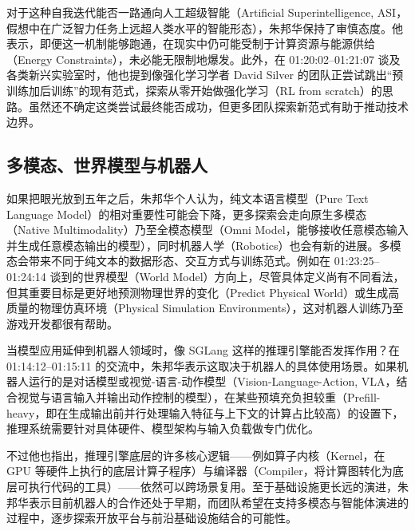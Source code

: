 \documentclass[UTF8,a4paper,11pt,fontset=fandol]{ctexart}
\begin{document}
对于这种自我迭代能否一路通向人工超级智能（Artificial Superintelligence, ASI，假想中在广泛智力任务上远超人类水平的智能形态），朱邦华保持了审慎态度。他表示，即便这一机制能够跑通，在现实中仍可能受制于计算资源与能源供给（Energy Constraints），未必能无限制地爆发。此外，在 01:20:02–01:21:07 谈及各类新兴实验室时，他也提到像强化学习学者 David Silver 的团队正尝试跳出“预训练加后训练”的现有范式，探索从零开始做强化学习（RL from scratch）的思路。虽然还不确定这类尝试最终能否成功，但更多团队探索新范式有助于推动技术边界。

\subsection{多模态、世界模型与机器人}
如果把眼光放到五年之后，朱邦华个人认为，纯文本语言模型（Pure Text Language Model）的相对重要性可能会下降，更多探索会走向原生多模态（Native Multimodality）乃至全模态模型（Omni Model，能够接收任意模态输入并生成任意模态输出的模型），同时机器人学（Robotics）也会有新的进展。多模态会带来不同于纯文本的数据形态、交互方式与训练范式。例如在 01:23:25–01:24:14 谈到的世界模型（World Model）方向上，尽管具体定义尚有不同看法，但其重要目标是更好地预测物理世界的变化（Predict Physical World）或生成高质量的物理仿真环境（Physical Simulation Environments），这对机器人训练乃至游戏开发都很有帮助。

当模型应用延伸到机器人领域时，像 SGLang 这样的推理引擎能否发挥作用？在 01:14:12–01:15:11 的交流中，朱邦华表示这取决于机器人的具体使用场景。如果机器人运行的是对话模型或视觉-语言-动作模型（Vision-Language-Action, VLA，结合视觉与语言输入并输出动作控制的模型），在某些预填充负担较重（Prefill-heavy，即在生成输出前并行处理输入特征与上下文的计算占比较高）的设置下，推理系统需要针对具体硬件、模型架构与输入负载做专门优化。

不过他也指出，推理引擎底层的许多核心逻辑——例如算子内核（Kernel，在 GPU 等硬件上执行的底层计算子程序）与编译器（Compiler，将计算图转化为底层可执行代码的工具）——依然可以跨场景复用。至于基础设施更长远的演进，朱邦华表示目前机器人的合作还处于早期，而团队希望在支持多模态与智能体演进的过程中，逐步探索开放平台与前沿基础设施结合的可能性。
\end{document}
